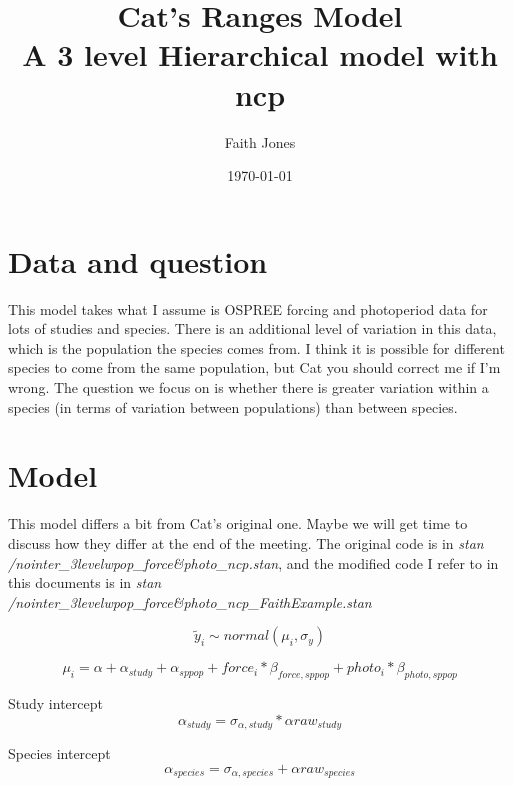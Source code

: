 \documentclass[11pt,letter]{article}
\title{Cat's Ranges Model \\ A 3 level Hierarchical model with ncp}
\date{\today}
\author{Faith Jones}
\begin{document}
\renewcommand{\bibname}{References}%


\maketitle{}
\tableofcontents

\section{Data and question}
This model takes what I assume is OSPREE forcing and photoperiod data for lots of studies and species. There is an additional level of variation in this data, which is the population the species comes from. I think it is possible for different species to come from the same population, but Cat you should correct me if I'm wrong. The question we focus on is whether there is greater variation within a species (in terms of variation between populations) than between species. 

\section{Model}

This model differs a bit from Cat's original one. Maybe we will get time to discuss how they differ at the end of the meeting. The original code is in \textit{stan\\/nointer\_3levelwpop\_force\&photo\_ncp.stan}, and the modified code I refer to in this documents is in \textit{stan\\/nointer\_3levelwpop\_force\&photo\_ncp\_FaithExample.stan}


\begin{equation}
\tilde{y}_{i}\sim normal(\mu_{i},\sigma_{y})
\end{equation}


\begin{equation}
\mu_{i} = \alpha + \alpha_{study} + \alpha_{sppop} + force_{i} * \beta _{force,sppop} + photo_{i} * \beta _{photo,sppop} 
\end{equation}

Study intercept 
\begin{equation}
\alpha_{study} =  \sigma_{\alpha, study} * \alpha raw_{study}
\end{equation}

Species intercept
\begin{equation}
\alpha_{species} = \sigma_{\alpha, species} + \alpha raw_{species}
\end{equation}
\end{document}
